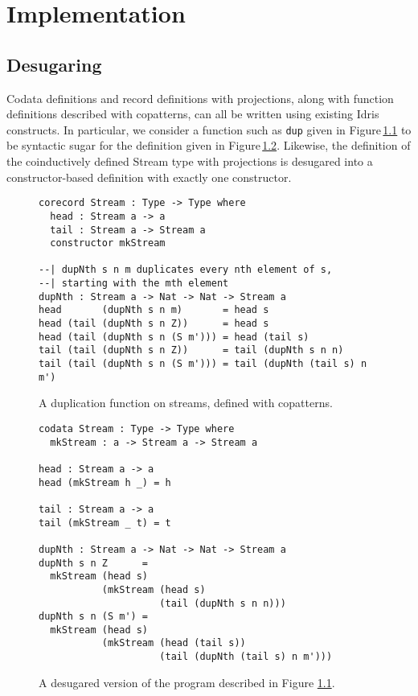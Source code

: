 \chapter{Implementation}

\section{Desugaring}
Codata definitions and record definitions with projections, along with function definitions described with copatterns, can all be written using existing Idris constructs. In particular, we consider a function such as \texttt{dup} given in Figure\,\ref{fig:dup_copatterns} to be syntactic sugar for the definition given in Figure\,\ref{fig:dup_desugared}. Likewise, the definition of the coinductively defined Stream type with projections is desugared into a constructor-based definition with exactly one constructor.

\begin{figure}
\begin{lstlisting}
corecord Stream : Type -> Type where
  head : Stream a -> a
  tail : Stream a -> Stream a
  constructor mkStream

--| dupNth s n m duplicates every nth element of s, 
--| starting with the mth element
dupNth : Stream a -> Nat -> Nat -> Stream a
head       (dupNth s n m)       = head s
head (tail (dupNth s n Z))      = head s
head (tail (dupNth s n (S m'))) = head (tail s)
tail (tail (dupNth s n Z))      = tail (dupNth s n n)
tail (tail (dupNth s n (S m'))) = tail (dupNth (tail s) n m')
\end{lstlisting}
\caption{A duplication function on streams, defined with copatterns.}
\label{fig:dup_copatterns}
\end{figure}

\begin{figure}
\begin{lstlisting}
codata Stream : Type -> Type where
  mkStream : a -> Stream a -> Stream a

head : Stream a -> a
head (mkStream h _) = h

tail : Stream a -> a
tail (mkStream _ t) = t

dupNth : Stream a -> Nat -> Nat -> Stream a
dupNth s n Z      =
  mkStream (head s)
           (mkStream (head s)
                     (tail (dupNth s n n)))
dupNth s n (S m') =
  mkStream (head s)
           (mkStream (head (tail s))
                     (tail (dupNth (tail s) n m')))
\end{lstlisting}
\caption{A desugared version of the program described in Figure \ref{fig:dup_copatterns}.}
\label{fig:dup_desugared}
\end{figure}

